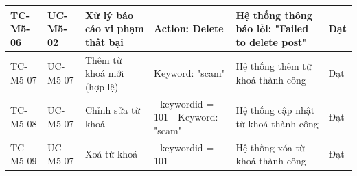 \begin{landscape}
\begin{longtable}{|p{2.2cm}|p{2.2cm}|p{4cm}|p{4.5cm}|p{6cm}|p{2cm}|}
TC-M5-06 & UC-M5-02 & Xử lý báo cáo vi phạm thât bại & Action: Delete & 
Hệ thống thông báo lỗi: "Failed to delete post" & Đạt \\
\hline

TC-M5-07 & UC-M5-07 & Thêm từ khoá mới (hợp lệ) & 
Keyword: "scam" & 
Hệ thống thêm từ khoá thành công & Đạt \\
\hline

TC-M5-08 & UC-M5-07 & Chỉnh sửa từ khoá & 
- keywordid = 101 \newline
- Keyword: "scam" & 
Hệ thống cập nhật từ khoá thành công & Đạt \\
\hline

TC-M5-09 & UC-M5-07 & Xoá từ khoá & 
- keywordid = 101 & 
Hệ thống xóa từ khoá thành công & Đạt \\
\hline


\end{longtable}
\end{landscape}
